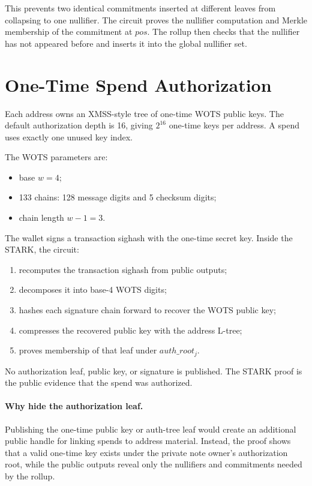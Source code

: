 \documentclass[11pt]{article}
\begin{document}
This prevents two identical commitments inserted at different leaves from
collapsing to one nullifier. The circuit proves the nullifier computation and
Merkle membership of the commitment at \(pos\). The rollup then checks that the
nullifier has not appeared before and inserts it into the global nullifier set.

\section{One-Time Spend Authorization}

Each address owns an XMSS-style tree of one-time WOTS public keys. The default
authorization depth is 16, giving \(2^{16}\) one-time keys per address. A spend
uses exactly one unused key index.

The WOTS parameters are:

\begin{itemize}
  \item base \(w = 4\);
  \item 133 chains: 128 message digits and 5 checksum digits;
  \item chain length \(w - 1 = 3\).
\end{itemize}

The wallet signs a transaction sighash with the one-time secret key. Inside the
STARK, the circuit:

\begin{enumerate}
  \item recomputes the transaction sighash from public outputs;
  \item decomposes it into base-4 WOTS digits;
  \item hashes each signature chain forward to recover the WOTS public key;
  \item compresses the recovered public key with the address L-tree;
  \item proves membership of that leaf under \(auth\_root_j\).
\end{enumerate}

No authorization leaf, public key, or signature is published. The STARK proof is
the public evidence that the spend was authorized.

\paragraph{Why hide the authorization leaf.}
Publishing the one-time public key or auth-tree leaf would create an additional
public handle for linking spends to address material. Instead, the proof shows
that a valid one-time key exists under the private note owner's authorization
root, while the public outputs reveal only the nullifiers and commitments needed
by the rollup.
\end{document}
